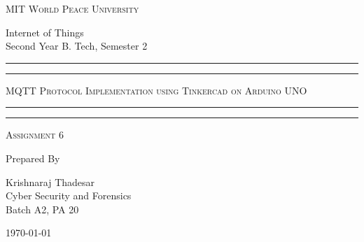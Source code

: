 \documentclass[11pt]{article}
\begin{document}
\begin{titlepage}
	\centering


	\huge\textsc{
		MIT World Peace University
	}\\

	\vspace{0.75\baselineskip} %

	\LARGE{
		Internet of Things\\
		Second Year B. Tech, Semester 2
	}

	\vfill %


	\rule{\textwidth}{1.6pt}\vspace*{-\baselineskip}\vspace*{2pt}
	\rule{\textwidth}{0.6pt}
	\vspace{0.75\baselineskip} %



	\huge{\textsc{
			MQTT Protocol Implementation using Tinkercad on Arduino UNO
		}} \\



	\vspace{0.5\baselineskip} %
	\rule{\textwidth}{0.6pt}\vspace*{-\baselineskip}\vspace*{2.8pt}
	\rule{\textwidth}{1.6pt}

	\vspace{1\baselineskip} %


	\LARGE\textsc{
		Assignment 6
	} %
	\vfill


	Prepared By
	\vspace{0.5\baselineskip} %

	\Large{
		Krishnaraj Thadesar \\
		Cyber Security and Forensics\\
		Batch A2, PA 20
	}


	\vspace{0.5\baselineskip} %
	\today

\end{titlepage}
\end{document}
